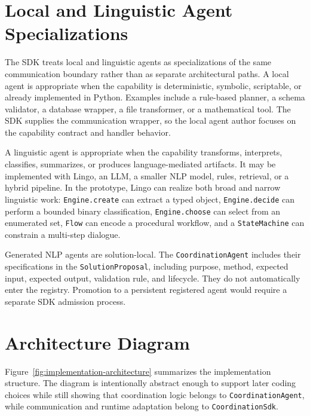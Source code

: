 \section{Local and Linguistic Agent Specializations}

The SDK treats local and linguistic agents as specializations of the same communication boundary rather than as separate architectural paths. A local agent is appropriate when the capability is deterministic, symbolic, scriptable, or already implemented in Python. Examples include a rule-based planner, a schema validator, a database wrapper, a file transformer, or a mathematical tool. The SDK supplies the communication wrapper, so the local agent author focuses on the capability contract and handler behavior.

A linguistic agent is appropriate when the capability transforms, interprets, classifies, summarizes, or produces language-mediated artifacts. It may be implemented with Lingo, an LLM, a smaller NLP model, rules, retrieval, or a hybrid pipeline. In the prototype, Lingo can realize both broad and narrow linguistic work: \texttt{Engine.create} can extract a typed object, \texttt{Engine.decide} can perform a bounded binary classification, \texttt{Engine.choose} can select from an enumerated set, \texttt{Flow} can encode a procedural workflow, and a \texttt{StateMachine} can constrain a multi-step dialogue.

Generated NLP agents are solution-local. The \texttt{CoordinationAgent} includes their specifications in the \texttt{SolutionProposal}, including purpose, method, expected input, expected output, validation rule, and lifecycle. They do not automatically enter the registry. Promotion to a persistent registered agent would require a separate SDK admission process.

\section{Architecture Diagram}

Figure~\ref{fig:implementation-architecture} summarizes the implementation structure. The diagram is intentionally abstract enough to support later coding choices while still showing that coordination logic belongs to \texttt{CoordinationAgent}, while communication and runtime adaptation belong to \texttt{CoordinationSdk}.

